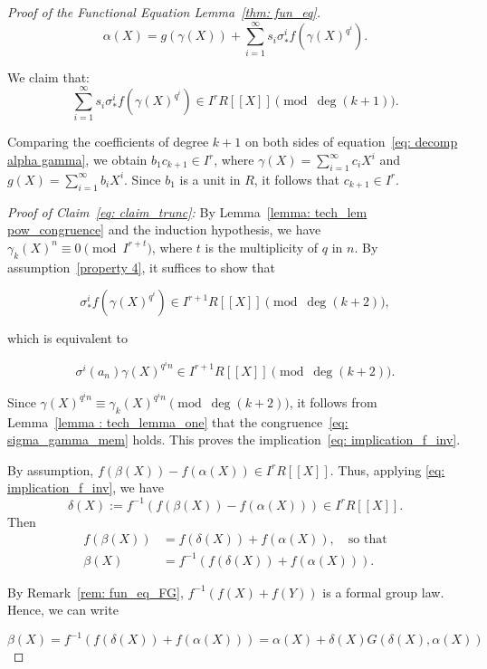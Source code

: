 \begin{proof}[Proof of the Functional Equation Lemma~\ref{thm: fun_eq}]
\begin{equation}
    \alpha(X) = g(\gamma(X)) + \sum_{i=1}^\infty s_i \sigma_*^i f(\gamma(X)^{q^i}).
    \label{eq: decomp alpha gamma}
\end{equation}

We claim that:
\begin{equation}
    \sum_{i=1}^\infty s_i \sigma_*^i f(\gamma(X)^{q^i}) \in I^r R[\![X]\!] \pmod{\deg(k + 1)}.
    \label{eq: claim_trunc}
\end{equation}

Comparing the coefficients of degree $k+1$ on both sides of equation~\eqref{eq: decomp alpha gamma},
we obtain $b_1 c_{k+1} \in I^r$, where $\gamma(X) = \sum_{i=1}^\infty c_i X^i$ and
$g(X) = \sum_{i=1}^\infty b_i X^i$. Since $b_1$ is a unit in $R$, it follows that $c_{k+1} \in I^r$.

\textit{Proof of Claim~\eqref{eq: claim_trunc}:} By Lemma~\ref{lemma: tech_lem pow_congruence}
and the induction hypothesis, we have $\gamma_k(X)^n \equiv 0 \pmod{I^{r + t}}$,
where $t$ is the multiplicity of $q$ in $n$. By assumption~\eqref{property 4},
it suffices to show that

\[\sigma_*^i f(\gamma(X)^{q^i}) \in I^{r+1} R[\![X]\!] \pmod{\deg(k + 2)},\]

which is equivalent to

\begin{equation}
    \sigma^i(a_n) \gamma(X)^{q^i n} \in I^{r+1} R[\![X]\!] \pmod{\deg(k + 2)}.
    \label{eq: sigma_gamma_mem}
\end{equation}

Since $\gamma(X)^{q^i n} \equiv \gamma_k(X)^{q^i n} \pmod{\deg(k + 2)}$, it follows from
Lemma~\ref{lemma : tech_lemma_one} that the congruence~\eqref{eq: sigma_gamma_mem} holds.
This proves the implication~\eqref{eq: implication_f_inv}.

By assumption, $f(\beta(X)) - f(\alpha(X)) \in I^r R[\![X]\!]$. Thus, applying
\eqref{eq: implication_f_inv}, we have
\[\delta(X) := f^{-1}(f(\beta(X)) - f(\alpha(X))) \in I^r R[\![X]\!]. \]
Then
\[\begin{aligned}
    f(\beta(X)) &= f(\delta(X)) + f(\alpha(X)), \quad \text{so that} \\
    \beta(X) &= f^{-1}(f(\delta(X)) + f(\alpha(X))).
\end{aligned} \]

By Remark~\ref{rem: fun_eq_FG}, $f^{-1}(f(X) + f(Y))$ is a formal group law. Hence, we can write

\[\beta(X) = f^{-1}(f(\delta(X)) + f(\alpha(X))) = \alpha(X) + \delta(X) G(\delta(X), \alpha(X))\]


\end{proof}
